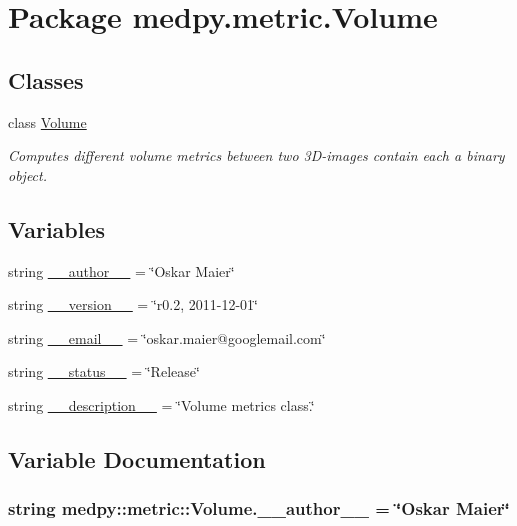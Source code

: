 \hypertarget{namespacemedpy_1_1metric_1_1Volume}{
\section{Package medpy.metric.Volume}
\label{namespacemedpy_1_1metric_1_1Volume}
}
\subsection*{Classes}
\begin{DoxyCompactItemize}
\item 
class \hyperlink{classmedpy_1_1metric_1_1Volume_1_1Volume}{Volume}
\begin{DoxyCompactList}\small\item\em Computes different volume metrics between two 3D-\/images contain each a binary object. \end{DoxyCompactList}\end{DoxyCompactItemize}
\subsection*{Variables}
\begin{DoxyCompactItemize}
\item 
string \hyperlink{namespacemedpy_1_1metric_1_1Volume_aea979e7298a3f445504e42511fdb1b06}{\_\-\_\-author\_\-\_\-} = \char`\"{}Oskar Maier\char`\"{}
\item 
string \hyperlink{namespacemedpy_1_1metric_1_1Volume_a7d49eba625f2786d0be1d2867f5fcd5c}{\_\-\_\-version\_\-\_\-} = \char`\"{}r0.2, 2011-\/12-\/01\char`\"{}
\item 
string \hyperlink{namespacemedpy_1_1metric_1_1Volume_ab447960674465e32579b2c55155d1990}{\_\-\_\-email\_\-\_\-} = \char`\"{}oskar.maier@googlemail.com\char`\"{}
\item 
string \hyperlink{namespacemedpy_1_1metric_1_1Volume_a57f29a09c9d9ee64bd060b2408f8b351}{\_\-\_\-status\_\-\_\-} = \char`\"{}Release\char`\"{}
\item 
string \hyperlink{namespacemedpy_1_1metric_1_1Volume_a397a8890b8ea74b388ad7a615451a178}{\_\-\_\-description\_\-\_\-} = \char`\"{}Volume metrics class.\char`\"{}
\end{DoxyCompactItemize}


\subsection{Variable Documentation}
\hypertarget{namespacemedpy_1_1metric_1_1Volume_aea979e7298a3f445504e42511fdb1b06}{
\subsubsection[{\_\-\_\-author\_\-\_\-}]{\setlength{\rightskip}{0pt plus 5cm}string {\bf medpy::metric::Volume.\_\-\_\-author\_\-\_\-} = \char`\"{}Oskar Maier\char`\"{}}}
\label{namespacemedpy_1_1metric_1_1Volume_aea979e7298a3f445504e42511fdb1b06}


